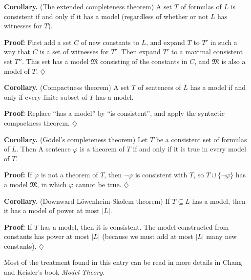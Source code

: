 \documentclass[12pt]{article}
\newcommand{\M}{\mathfrak{M}}
\begin{document}
{\bf Corollary.}
(The extended completeness theorem) A set $T$ of formulas of $L$ is
consistent if and only if it has a model (regardless of whether or not
$L$ has witnesses for $T$).

{\bf Proof:}
First add a set $C$ of new constants to $L$, and expand $T$ to $T'$ in
such a way that $C$ is a set of witnesses for $T'$.  Then expand $T'$
to a maximal consistent set $T''$.  This set has a model $\M$ consisting of
the constants in $C$, and $\M$ is also a model of $T$.
\hfill$\diamondsuit$

{\bf Corollary.}
(Compactness theorem) A set $T$ of sentences of $L$ has a model if
and only if every finite subset of $T$ has a model.

{\bf Proof:}
Replace ``has a model'' by ``is consistent'', and apply the syntactic
compactness theorem.
\hfill$\diamondsuit$

{\bf Corollary.}
(G\"odel's completeness theorem)
Let $T$ be a consistent set of formulas of $L$.  Then
A sentence $\varphi$ is a theorem of $T$ if and only if it is true in
every model of $T$.

{\bf Proof:}
If $\varphi$ is not a theorem of $T$, then $\neg\varphi$ is consistent
with $T$, so $T\cup\{\neg\varphi\}$ has a model $\M$, in which
$\varphi$ cannot be true.
\hfill$\diamondsuit$

{\bf Corollary.}
(Downward L\"owenheim-Skolem theorem)  If $T\subseteq L$ has a model,
then it has a model of power at most $|L|$.

{\bf Proof:}
If $T$ has a model, then it is consistent.  The model constructed from
constants has power at most $|L|$ (because we must add at most $|L|$
many new constants).
\hfill$\diamondsuit$

Most of the treatment found in this entry can be read in more details
in Chang and Keisler's book {\em Model Theory}.
\end{document}
